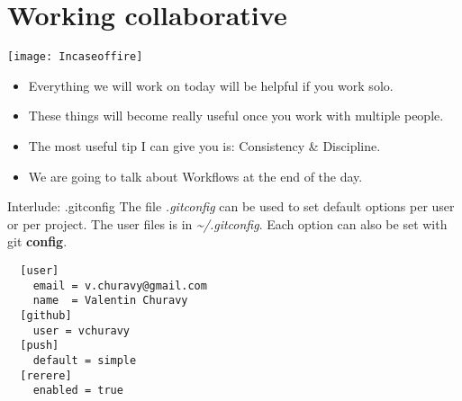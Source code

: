 \documentclass{beamer}
\begin{document}
\section{Working collaborative}
\begin{frame}[fragile]
  \centering
  \texttt{[image: Incaseoffire]}
  \begin{itemize}
    \item Everything we will work on today will be helpful if you work solo.
    \item These things will become really useful once you work with multiple people.
    \pause
    \item The most useful tip I can give you is: Consistency \& Discipline.
    \item We are going to talk about Workflows at the end of the day.
  \end{itemize}
\end{frame}
\begin{frame}[fragile]{Interlude: .gitconfig}
  The file \emph{.gitconfig} can be used to set default options per user or per project. The user files is in \emph{\textasciitilde/.gitconfig}. Each option can also be set with git \textbf{config}.
  \begin{lstlisting}
  [user]
    email = v.churavy@gmail.com
    name  = Valentin Churavy
  [github]
    user = vchuravy
  [push]
    default = simple
  [rerere]
    enabled = true
  \end{lstlisting}
\end{frame}
\end{document}

